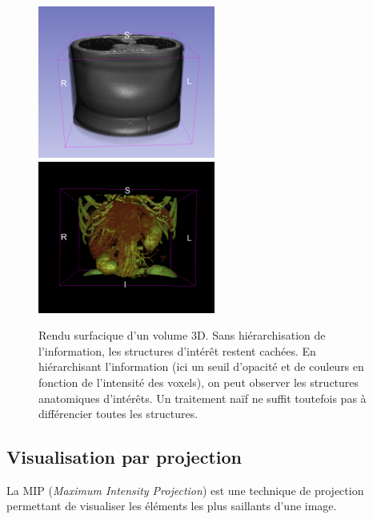     \begin{figure}[!ht]
      \centering
      \includegraphics[height=5cm]{Images/hierarchy_3D.png}
      \includegraphics[height=5cm]{Images/hierarchy_3D_bis.png}
      \caption{Rendu surfacique d'un volume 3D. Sans hiérarchisation de l'information, les structures d'intérêt restent cachées. En hiérarchisant l'information (ici un seuil d'opacité et de couleurs en fonction de l'intensité des voxels), on peut observer les structures anatomiques d'intérêts. Un traitement naïf ne suffit toutefois pas à différencier toutes les structures.}
      \label{fig:hierachy_3D}
    \end{figure}


      \subsection{Visualisation par projection}

      La MIP (\textit{Maximum Intensity Projection}) est une technique de projection permettant de visualiser les éléments les plus saillants d'une image.  


